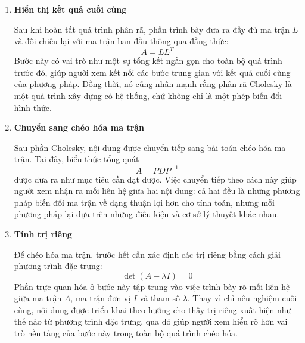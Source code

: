 \documentclass[12pt,a4paper]{article}
\begin{document}
\begin{enumerate}[label=\textbf{\alph*) Bước \arabic*:}, leftmargin=*, align=left]
Quá trình xây dựng $L$ được triển khai theo đúng tinh thần của thuật toán, tức là xác định lần lượt các phần tử từ trên xuống dưới, từ trái sang phải. Ở mỗi bước, phần minh họa gắn công thức tính toán với vị trí tương ứng trong ma trận, để người xem nhận ra rằng mỗi phần tử của $L$ không xuất hiện một cách độc lập mà được xác định từ các giá trị đã tính trước đó. Nhờ vậy, cấu trúc truy hồi của thuật toán Cholesky được thể hiện rõ ràng hơn so với khi chỉ đọc công thức trên giấy.

\item \textbf{Hiển thị kết quả cuối cùng}

Sau khi hoàn tất quá trình phân rã, phần trình bày đưa ra đầy đủ ma trận $L$ và đối chiếu lại với ma trận ban đầu thông qua đẳng thức:
\begin{equation}
A = L L^T
\end{equation}
Bước này có vai trò như một sự tổng kết ngắn gọn cho toàn bộ quá trình trước đó, giúp người xem kết nối các bước trung gian với kết quả cuối cùng của phương pháp. Đồng thời, nó cũng nhấn mạnh rằng phân rã Cholesky là một quá trình xây dựng có hệ thống, chứ không chỉ là một phép biến đổi hình thức.

\item \textbf{Chuyển sang chéo hóa ma trận}

Sau phần Cholesky, nội dung được chuyển tiếp sang bài toán chéo hóa ma trận. Tại đây, biểu thức tổng quát
\begin{equation}
A = P D P^{-1}
\end{equation}
được đưa ra như mục tiêu cần đạt được. Việc chuyển tiếp theo cách này giúp người xem nhận ra mối liên hệ giữa hai nội dung: cả hai đều là những phương pháp biến đổi ma trận về dạng thuận lợi hơn cho tính toán, nhưng mỗi phương pháp lại dựa trên những điều kiện và cơ sở lý thuyết khác nhau.

\item \textbf{Tính trị riêng}

Để chéo hóa ma trận, trước hết cần xác định các trị riêng bằng cách giải phương trình đặc trưng:
\begin{equation}
\det(A - \lambda I) = 0
\end{equation}
Phần trực quan hóa ở bước này tập trung vào việc trình bày rõ mối liên hệ giữa ma trận $A$, ma trận đơn vị $I$ và tham số $\lambda$. Thay vì chỉ nêu nghiệm cuối cùng, nội dung được triển khai theo hướng cho thấy trị riêng xuất hiện như thế nào từ phương trình đặc trưng, qua đó giúp người xem hiểu rõ hơn vai trò nền tảng của bước này trong toàn bộ quá trình chéo hóa.


\end{enumerate}
\end{document}

